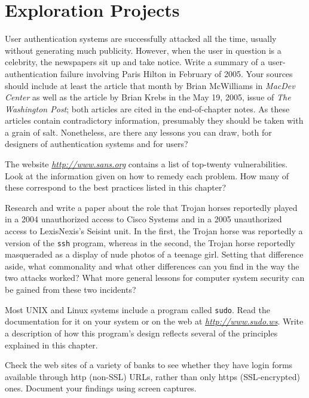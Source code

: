 \section*{Exploration Projects}
\begin{chapterEnumerate}

\item\label{paris-hilton-project}
User authentication systems are successfully attacked all the time,
usually without generating much publicity.  However, when the user in
question is a celebrity, the newspapers sit up and take notice.  Write
a summary of a user-authentication failure involving Paris Hilton in
February of 2005.  Your sources should include at least the article that
month by Brian McWilliams in \textit{MacDev Center} as well as the
article by Brian Krebs in the May 19, 2005, issue
of \textit{The Washington Post}; both articles are cited in the
end-of-chapter notes.  As these articles contain contradictory
information, presumably they should be taken with a grain of salt.
Nonetheless, are there any lessons you can draw, both for designers of authentication systems and
for users?

\item
The website \textit{\url{http://www.sans.org}} contains a list of top-twenty vulnerabilities.  Look at the information
given on how to remedy each problem.  How many of these correspond to
the best practices listed in this chapter?

\item
Research and write a paper about the role that Trojan horses
reportedly played in a 2004 unauthorized access to Cisco Systems and
in a 2005 unauthorized access to LexisNexis's Seisint unit.  In the
first, the Trojan horse was reportedly a version of the {\tt ssh}
program, whereas in the second, the Trojan horse reportedly
masqueraded as a display of nude photos of a teenage girl.  Setting
that difference aside, what commonality and what other differences can
you find in the way the two attacks worked?  What more general lessons
for computer system security can be gained from these two incidents?

\item
Most UNIX and Linux systems include a program called {\tt sudo}.  Read
the documentation for it on your system or on the web at
\textit{\url{http://www.sudo.ws}}.  Write a description of how this
program's design reflects several of the principles explained
in this chapter.

\item
Check the web sites of a variety of banks to see whether they have login forms available through http (non-SSL) URLs, rather than only https (SSL-encrypted) ones.  Document your findings using screen captures.


\end{chapterEnumerate}
